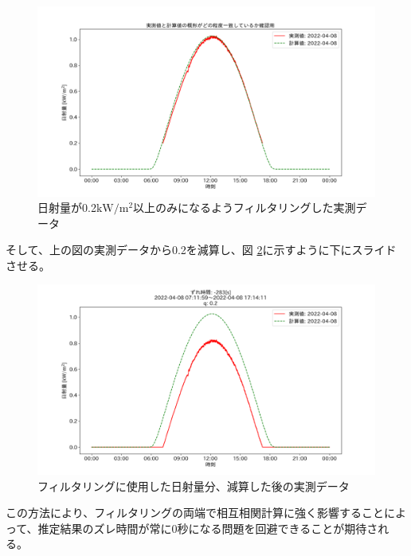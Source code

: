 \documentclass[a4j,12pt,]{jarticle}
\begin{document}
\begin{figure}[H]
  \begin{center}
    \includegraphics[width=160mm]{2022-04-08_mask_by_q_plot.png}
    \caption{日射量が0.2$\mathrm{kW}/\mathrm{m}^2$以上のみになるようフィルタリングした実測データ}
    \label{p9}
  \end{center}
\end{figure}

そして、上の図の実測データから0.2を減算し、図 \ref{p10}に示すように下にスライドさせる。

\begin{figure}[H]
  \begin{center}
    \includegraphics[width=160mm]{2022-04-08_mask_by_q_corr.png}
    \caption{フィルタリングに使用した日射量分、減算した後の実測データ}
    \label{p10}
  \end{center}
\end{figure}

この方法により、フィルタリングの両端で相互相関計算に強く影響することによって、推定結果のズレ時間が常に0秒になる問題を回避できることが期待される。
\end{document}
